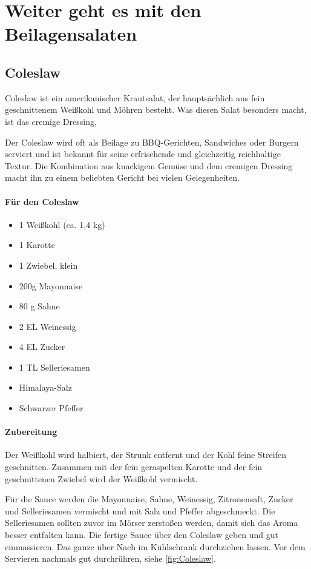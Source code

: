 \section{Weiter geht es mit den Beilagensalaten}

\subsection{Coleslaw}\label{Coleslaw}

Coleslaw ist ein amerikanischer Krautsalat, der hauptsächlich aus fein 
geschnittenem Weißkohl und Möhren besteht. Was diesen Salat besonders 
macht, ist das cremige Dressing,

Der Coleslaw wird oft als Beilage zu BBQ-Gerichten, Sandwiches oder Burgern 
serviert und ist bekannt für seine erfrischende und gleichzeitig reichhaltige 
Textur. Die Kombination aus knackigem Gemüse und dem cremigen Dressing 
macht ihn zu einem beliebten Gericht bei vielen Gelegenheiten.

\paragraph{Für den Coleslaw}

\begin{itemize}[noitemsep]
	\item 1 Weißkohl (ca. 1,4 kg)
	\item 1 Karotte
	\item 1 Zwiebel, klein
	\item 200g Mayonnaise
	\item 80 g Sahne
	\item 2 EL Weinessig
	\item 4 EL Zucker
	\item 1 TL Selleriesamen
	\item Himalaya-Salz
	\item Schwarzer Pfeffer
\end{itemize}

\paragraph{Zubereitung}

Der Weißkohl wird halbiert, der Strunk entfernt und der Kohl feine Streifen 
geschnitten. Zusammen mit der fein geraspelten Karotte und der fein 
geschnittenen Zwiebel wird der Weißkohl vermischt.

Für die Sauce werden die Mayonnaise, Sahne, Weinessig, Zitronensaft, Zucker 
und Selleriesamen vermischt und mit Salz und Pfeffer abgeschmeckt. Die 
Selleriesamen sollten zuvor im Mörser zerstoßen werden, damit sich das Aroma 
besser entfalten kann. Die fertige Sauce über den Coleslaw geben und gut 
einmassieren. Das ganze über Nach im Kühlschrank durchziehen lassen. Vor 
dem Servieren nachmals gut durchrühren, siehe \vref{fig:Coleslaw}.

